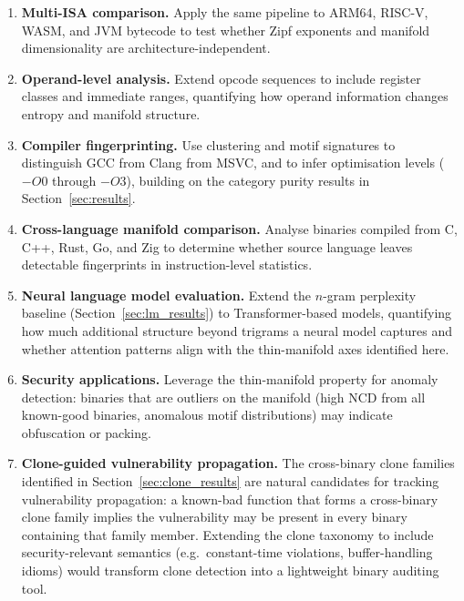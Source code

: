 \documentclass[10pt,twocolumn]{article}
\begin{document}
\begin{enumerate}
  \item \textbf{Multi-ISA comparison.}  Apply the same pipeline to ARM64,
        RISC-V, WASM, and JVM bytecode to test whether Zipf exponents and
        manifold dimensionality are architecture-independent.
  \item \textbf{Operand-level analysis.}  Extend opcode sequences to include
        register classes and immediate ranges, quantifying how operand
        information changes entropy and manifold structure.
  \item \textbf{Compiler fingerprinting.}  Use clustering and motif signatures
        to distinguish GCC from Clang from MSVC, and to infer optimisation
        levels ($-O0$ through $-O3$), building on the category purity results
        in Section~\ref{sec:results}.
  \item \textbf{Cross-language manifold comparison.}  Analyse binaries compiled
        from C, C++, Rust, Go, and Zig to determine whether source language
        leaves detectable fingerprints in instruction-level statistics.
  \item \textbf{Neural language model evaluation.}  Extend the $n$-gram
        perplexity baseline (Section~\ref{sec:lm_results}) to Transformer-based
        models, quantifying how much additional structure beyond trigrams a
        neural model captures and whether attention patterns align with the
        thin-manifold axes identified here.
  \item \textbf{Security applications.}  Leverage the thin-manifold property
        for anomaly detection: binaries that are outliers on the manifold (high
        NCD from all known-good binaries, anomalous motif distributions) may
        indicate obfuscation or packing.
  \item \textbf{Clone-guided vulnerability propagation.}  The cross-binary
        clone families identified in Section~\ref{sec:clone_results} are
        natural candidates for tracking vulnerability propagation: a known-bad
        function that forms a cross-binary clone family implies the vulnerability
        may be present in every binary containing that family member.  Extending
        the clone taxonomy to include security-relevant semantics (e.g.\
        constant-time violations, buffer-handling idioms) would transform clone
        detection into a lightweight binary auditing tool.
\end{enumerate}



\end{document}
